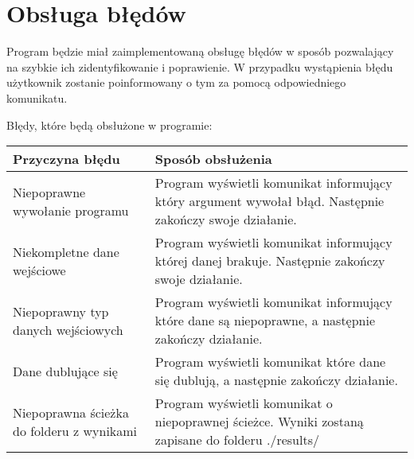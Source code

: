 \documentclass[a4paper,11pt,notitlepage]{article}
\begin{document}
\section{Obsługa błędów}
Program będzie miał zaimplementowaną obsługę błędów w sposób pozwalający na szybkie ich zidentyfikowanie i poprawienie. W przypadku wystąpienia błędu użytkownik zostanie poinformowany o tym za pomocą odpowiedniego komunikatu.  

\vspace{0.1in}
Błędy, które będą obsłużone w programie:

\vspace{0.1in}
\begin{tabular}{p{3cm}|p{8cm}}

Przyczyna błędu& Sposób obsłużenia\\
\hline\hline
Niepoprawne wywołanie programu & Program wyświetli komunikat informujący który argument wywołał błąd. Następnie zakończy swoje działanie.\\
\hline
Niekompletne dane wejściowe & Program wyświetli komunikat informujący której danej brakuje. Następnie zakończy swoje działanie.\\
\hline
Niepoprawny typ danych wejściowych & Program wyświetli komunikat informujący które dane są niepoprawne, a następnie zakończy działanie.\\
\hline
Dane dublujące się & Program wyświetli komunikat które dane się dublują, a następnie zakończy działanie.\\
\hline
Niepoprawna ścieżka do folderu z wynikami & Program wyświetli komunikat o niepoprawnej ścieżce. Wyniki zostaną zapisane do folderu ./results/\\

\end{tabular}
\end{document}
